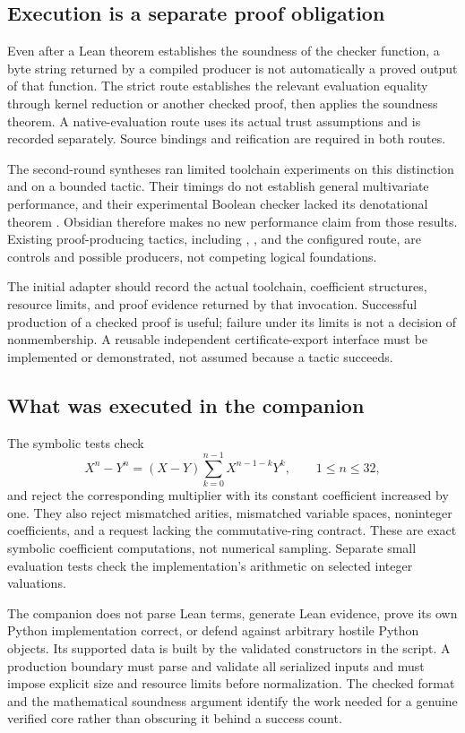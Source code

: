 \documentclass[11pt,a4paper]{article}
\newcommand{\code}[1]{\texttt{\detokenize{#1}}}
\theoremstyle{plain}\newtheorem{proposition}{Proposition}[section]
\theoremstyle{definition}\newtheorem{definition}[proposition]{Definition}
\theoremstyle{remark}\newtheorem{remark}[proposition]{Remark}
\begin{document}
\subsection{Execution is a separate proof obligation}
Even after a Lean theorem establishes the soundness of the checker function, a byte string returned by a compiled producer is not automatically a proved output of that function. The strict route establishes the relevant evaluation equality through kernel reduction or another checked proof, then applies the soundness theorem. A native-evaluation route uses its actual trust assumptions and is recorded separately. Source bindings and reification are required in both routes.

The second-round syntheses ran limited toolchain experiments on this distinction and on a bounded \code{grobner} tactic. Their timings do not establish general multivariate performance, and their experimental Boolean checker lacked its denotational theorem \cite{synA,synB}. Obsidian therefore makes no new performance claim from those results. Existing proof-producing tactics, including \code{ring}, \code{linear_combination}, and the configured \code{grobner} route, are controls and possible producers, not competing logical foundations.

The initial \code{grobner} adapter should record the actual toolchain, coefficient structures, resource limits, and proof evidence returned by that invocation. Successful production of a checked proof is useful; failure under its limits is not a decision of nonmembership. A reusable independent certificate-export interface must be implemented or demonstrated, not assumed because a tactic succeeds.

\subsection{What was executed in the companion}
The symbolic tests check
\[
 X^n-Y^n=(X-Y)\sum_{k=0}^{n-1}X^{n-1-k}Y^k,
 \qquad 1\le n\le32,
\]
and reject the corresponding multiplier with its constant coefficient increased by one. They also reject mismatched arities, mismatched variable spaces, noninteger coefficients, and a request lacking the commutative-ring contract. These are exact symbolic coefficient computations, not numerical sampling. Separate small evaluation tests check the implementation's arithmetic on selected integer valuations.

The companion does not parse Lean terms, generate Lean evidence, prove its own Python implementation correct, or defend against arbitrary hostile Python objects. Its supported data is built by the validated constructors in the script. A production boundary must parse and validate all serialized inputs and must impose explicit size and resource limits before normalization. The checked format and the mathematical soundness argument identify the work needed for a genuine verified core rather than obscuring it behind a success count.
\end{document}
